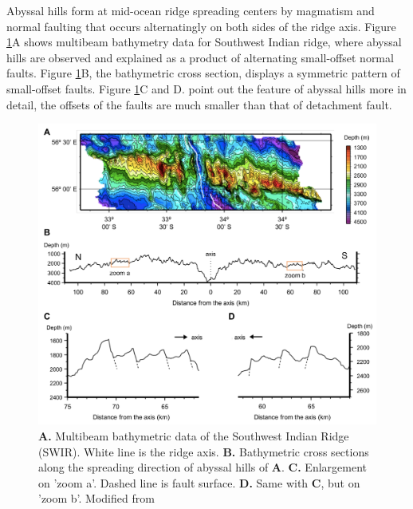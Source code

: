 \documentclass[letterpaper,12pt,notitle]{memphisthesis}                     %
\begin{document}
Abyssal hills form at mid-ocean ridge spreading centers by magmatism and normal faulting that occurs alternatingly on both sides of the ridge axis. Figure \ref{fig:abyssalhill}A shows multibeam bathymetry data for Southwest Indian ridge, where abyssal hills are observed and explained as a product of alternating small-offset normal faults. Figure \ref{fig:abyssalhill}B, the bathymetric cross section, displays a symmetric pattern of small-offset faults. Figure \ref{fig:abyssalhill}C and D. point out the feature of abyssal hills more in detail, the offsets of the faults are much smaller than that of detachment fault.
%
\begin{figure}[!htb]
	\centering
	\includegraphics[width=0.98\linewidth]{./figs/abyssalhill.pdf}
	\caption{ \textbf{A.} Multibeam bathymetric data of the Southwest Indian Ridge (SWIR). White line is the ridge axis. \textbf{B.} Bathymetric cross sections along the spreading direction of abyssal hills of \textbf{A}. \textbf{C.} Enlargement on 'zoom a'. Dashed line is fault surface. \textbf{D.} Same with \textbf{C}, but on 'zoom b'. Modified from \citet{Mendel2003}}
	\label{fig:abyssalhill}
\end{figure}
%
\end{document}

